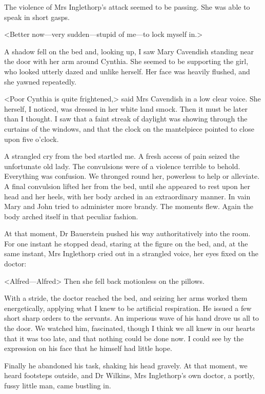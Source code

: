  The violence of Mrs Inglethorp's attack seemed to be passing. She was able to speak in short gasps. 

 <Better now—very sudden—stupid of me—to lock myself in.> 

 A shadow fell on the bed and, looking up, I saw Mary Cavendish standing near the door with her arm around Cynthia. She seemed to be supporting the girl, who looked utterly dazed and unlike herself. Her face was heavily flushed, and she yawned repeatedly. 

 <Poor Cynthia is quite frightened,> said Mrs Cavendish in a low clear voice. She herself, I noticed, was dressed in her white land smock. Then it must be later than I thought. I saw that a faint streak of daylight was showing through the curtains of the windows, and that the clock on the mantelpiece pointed to close upon five o'clock. 

 A strangled cry from the bed startled me. A fresh access of pain seized the unfortunate old lady. The convulsions were of a violence terrible to behold. Everything was confusion. We thronged round her, powerless to help or alleviate. A final convulsion lifted her from the bed, until she appeared to rest upon her head and her heels, with her body arched in an extraordinary manner. In vain Mary and John tried to administer more brandy. The moments flew. Again the body arched itself in that peculiar fashion. 

 At that moment, Dr Bauerstein pushed his way authoritatively into the room. For one instant he stopped dead, staring at the figure on the bed, and, at the same instant, Mrs Inglethorp cried out in a strangled voice, her eyes fixed on the doctor: 

 <Alfred—Alfred\longdash> Then she fell back motionless on the pillows. 

 With a stride, the doctor reached the bed, and seizing her arms worked them energetically, applying what I knew to be artificial respiration. He issued a few short sharp orders to the servants. An imperious wave of his hand drove us all to the door. We watched him, fascinated, though I think we all knew in our hearts that it was too late, and that nothing could be done now. I could see by the expression on his face that he himself had little hope. 

 Finally he abandoned his task, shaking his head gravely. At that moment, we heard footsteps outside, and Dr Wilkins, Mrs Inglethorp's own doctor, a portly, fussy little man, came bustling in. 

